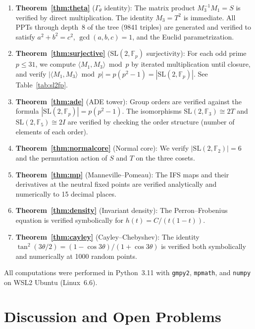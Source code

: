 \documentclass[12pt]{amsart}
\theoremstyle{definition}
\theoremstyle{remark}
\newcommand{\SL}{\mathrm{SL}}
\newcommand{\Fp}{\mathbb{F}_p}
\newcommand{\Gtheta}{\Gamma_\theta}
\begin{document}
\begin{enumerate}[label=(\roman*)]
\item \textbf{Theorem~\ref{thm:theta}} ($\Gtheta$ identity):
The matrix product $M_3^{-1}M_1 = S$ is verified by direct
multiplication.  The identity $M_3 = T^2$ is immediate.  All PPTs
through depth~8 of the tree (9841 triples) are generated and verified to
satisfy $a^2+b^2=c^2$, $\gcd(a,b,c)=1$, and the Euclid parametrization.

\item \textbf{Theorem~\ref{thm:surjective}} ($\SL(2,\Fp)$ surjectivity):
For each odd prime $p \le 31$, we compute $\langle M_1, M_3\rangle
\bmod p$ by iterated multiplication until closure, and verify
$|\langle M_1, M_3\rangle \bmod p| = p(p^2-1) = |\SL(2,\Fp)|$.
See Table~\ref{tab:sl2fp}.

\item \textbf{Theorem~\ref{thm:ade}} (ADE tower): Group orders are
verified against the formula $|\SL(2,\Fp)| = p(p^2-1)$.  The
isomorphisms $\SL(2,\mathbb{F}_3) \cong 2T$ and
$\SL(2,\mathbb{F}_5) \cong 2I$ are verified by checking the order
structure (number of elements of each order).

\item \textbf{Theorem~\ref{thm:normalcore}} (Normal core): We verify
$|\SL(2,\mathbb{F}_2)| = 6$ and the permutation action of $S$ and $T$
on the three cosets.

\item \textbf{Theorem~\ref{thm:mp}} (Manneville--Pomeau): The IFS
maps and their derivatives at the neutral fixed points are verified
analytically and numerically to 15 decimal places.

\item \textbf{Theorem~\ref{thm:density}} (Invariant density): The
Perron--Frobenius equation is verified symbolically for $h(t) =
C/(t(1-t))$.

\item \textbf{Theorem~\ref{thm:cayley}} (Cayley--Chebyshev): The
identity $\tan^2(3\theta/2) = (1-\cos 3\theta)/(1+\cos 3\theta)$ is
verified both symbolically and numerically at 1000 random points.
\end{enumerate}

All computations were performed in Python~3.11 with \texttt{gmpy2},
\texttt{mpmath}, and \texttt{numpy} on WSL2 Ubuntu (Linux~6.6).


\section{Discussion and Open Problems}\label{sec:discussion}
\end{document}
